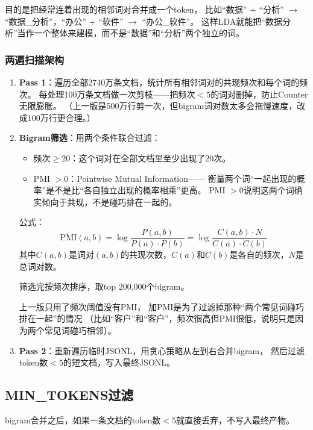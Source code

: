 \documentclass[12pt,a4paper]{ctexart}
\begin{document}
目的是把经常连着出现的相邻词对合并成一个token，
比如``数据'' + ``分析'' $\to$ ``数据\_分析''，``办公'' + ``软件'' $\to$ ``办公\_软件''。
这样LDA就能把``数据分析''当作一个整体来建模，而不是``数据''和``分析''两个独立的词。

\subsubsection{两遍扫描架构}

\begin{enumerate}
\item \textbf{Pass 1}：遍历全部2740万条文档，统计所有相邻词对的共现频次和每个词的频次。
每处理100万条文档做一次剪枝——把频次$< 5$的词对删掉，防止Counter无限膨胀。
（上一版是500万行剪一次，但bigram词对数太多会拖慢速度，改成100万行更合理。）

\item \textbf{Bigram筛选}：用两个条件联合过滤：
\begin{itemize}
\item 频次$\geq 20$：这个词对在全部文档里至少出现了20次。
\item PMI $> 0$：Pointwise Mutual Information——
衡量两个词``一起出现的概率''是不是比``各自独立出现的概率相乘''更高。
PMI $> 0$说明这两个词确实倾向于共现，不是碰巧排在一起的。
\end{itemize}
公式：
\[
\text{PMI}(a, b) = \log \frac{P(a, b)}{P(a) \cdot P(b)}
= \log \frac{C(a,b) \cdot N}{C(a) \cdot C(b)}
\]
其中$C(a,b)$是词对$(a,b)$的共现次数，$C(a)$和$C(b)$是各自的频次，$N$是总词对数。

筛选完按频次排序，取top 200,000个bigram。

上一版只用了频次阈值没有PMI，
加PMI是为了过滤掉那种``两个常见词碰巧排在一起''的情况
（比如``客户''和``客户''，频次很高但PMI很低，说明只是因为两个常见词碰巧相邻）。

\item \textbf{Pass 2}：重新遍历临时JSONL，用贪心策略从左到右合并bigram，
然后过滤token数$< 5$的短文档，写入最终JSONL。
\end{enumerate}


\subsection{MIN\_TOKENS过滤}

bigram合并之后，如果一条文档的token数$< 5$就直接丢弃，不写入最终产物。
\end{document}
